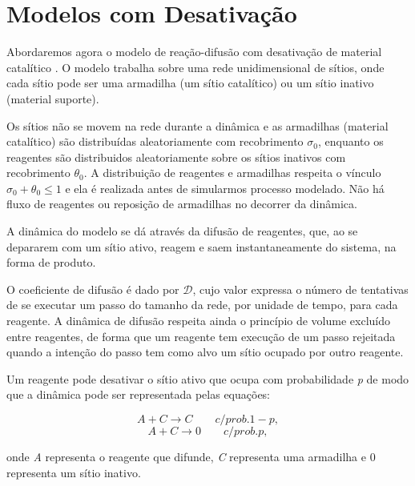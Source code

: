 
\section{Modelos com Desativação}

Abordaremos agora o modelo de reação-difusão com desativação de material
catalítico \cite{7}. O modelo trabalha sobre uma rede unidimensional de
sítios, onde cada sítio pode ser uma armadilha (um sítio catalítico) ou um sítio
inativo (material suporte).

Os sítios não se movem na rede durante a dinâmica e
as armadilhas (material catalítico) são distribuídas aleatoriamente com
recobrimento $\sigma_0$, enquanto os reagentes são distribuidos aleatoriamente
sobre os sítios inativos com recobrimento $\theta_0$. A distribuição de
reagentes e armadilhas respeita o vínculo $\sigma_0 + \theta_0 \leq 1$ e ela é
realizada antes de simularmos processo modelado. Não há fluxo de reagentes ou
reposição de armadilhas no decorrer da dinâmica.

A dinâmica do modelo se dá através da difusão de reagentes, que, ao se depararem
com um sítio ativo, reagem e saem instantaneamente do sistema, na forma de
produto.

O coeficiente de difusão é dado por $\mathcal{D}$, cujo valor expressa
o número de tentativas de se executar um passo do tamanho da rede, por unidade
de tempo, para cada reagente. A dinâmica de difusão respeita ainda o princípio
de volume excluído entre reagentes, de forma que um reagente tem execução de um
passo rejeitada quando a intenção do passo tem como alvo um sítio ocupado por
outro reagente.

Um reagente pode desativar o sítio ativo que ocupa com probabilidade \textit{p}
de modo que a dinâmica pode ser representada pelas equações:

{
\setlength{\belowdisplayskip}{0pt} \setlength{\belowdisplayshortskip}{0pt}
\setlength{\abovedisplayskip}{0pt} \setlength{\abovedisplayshortskip}{0pt}

\begin{equation}
  A + C \longrightarrow C \qquad c/ prob. 1 - p,
  \label{Equation-031-ModeloTradicional}
\end{equation}
\begin{equation}
  A + C \longrightarrow 0 \qquad c/ prob. p,
  \label{Equation-032-ModeloEnvenenamento}
\end{equation}
}

\noindent onde \textit{A} representa o reagente que difunde, \textit{C}
representa uma armadilha e 0 representa um sítio inativo.

